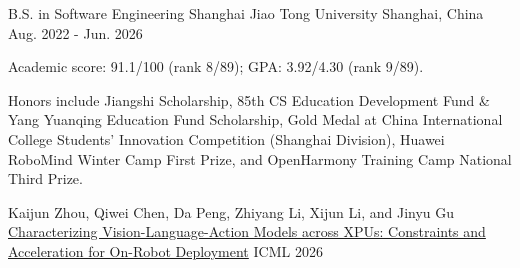 \documentclass[10pt, a4paper]{awesome-cv}
\begin{document}
\makecvheader[C]
\makecvfooter{}{}{}

\begin{cventries}
  \cventry
    {B.S. in Software Engineering}
    {Shanghai Jiao Tong University}
    {Shanghai, China}
    {Aug. 2022 - Jun. 2026}
    {
      \begin{cvitems}
        \item {Academic score: 91.1/100 (rank 8/89); GPA: 3.92/4.30 (rank 9/89).}
        \item {Honors include Jiangshi Scholarship, 85th CS Education Development Fund \& Yang Yuanqing Education Fund Scholarship, Gold Medal at China International College Students' Innovation Competition (Shanghai Division), Huawei RoboMind Winter Camp First Prize, and OpenHarmony Training Camp National Third Prize.}
      \end{cvitems}
    }
\end{cventries}

\begin{cventries}
  \cventry
    {Kaijun Zhou, Qiwei Chen, Da Peng, Zhiyang Li, Xijun Li, and Jinyu Gu}
    {\href{https://arxiv.org/abs/2604.24447}{Characterizing Vision-Language-Action Models across XPUs: Constraints and Acceleration for On-Robot Deployment}}
    {ICML}
    {2026}
    {}
\end{cventries}
\end{document}
